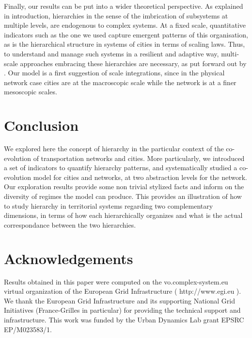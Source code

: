 \documentclass[11pt]{article}
\begin{document}
Finally, our results can be put into a wider theoretical perspective. As explained in introduction, hierarchies in the sense of the imbrication of subsystems at multiple levels, are endogenous to complex systems. At a fixed scale, quantitative indicators such as the one we used capture emergent patterns of this organisation, as is the hierarchical structure in systems of cities in terms of scaling laws. Thus, to understand and manage such systems in a resilient and adaptive way, multi-scale approaches embracing these hierarchies are necessary, as put forward out by \cite{rozenblat2018conclusion}. Our model is a first suggestion of scale integrations, since in the physical network case cities are at the macroscopic scale while the network is at a finer mesoscopic scales.




\section{Conclusion}

We explored here the concept of hierarchy in the particular context of the co-evolution of transportation networks and cities. More particularly, we introduced a set of indicators to quantify hierarchy patterns, and systematically studied a co-evolution model for cities and networks, at two abstraction levels for the network. Our exploration results provide some non trivial stylized facts and inform on the diversity of regimes the model can produce. This provides an illustration of how to study hierarchy in territorial systems regarding two complementary dimensions, in terms of how each hierarchically organizes and what is the actual correspondance between the two hierarchies.



\section{Acknowledgements}

Results obtained in this paper were computed on the vo.complex-system.eu virtual organization of the European Grid Infrastructure ( http://www.egi.eu ). We thank the European Grid Infrastructure and its supporting National Grid Initiatives (France-Grilles in particular) for providing the technical support and infrastructure. This work was funded by the Urban Dynamics Lab grant EPSRC EP/M023583/1.
\end{document}
